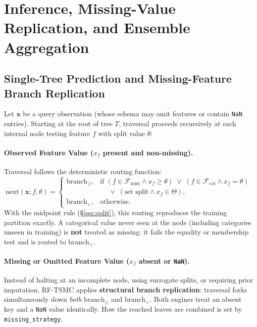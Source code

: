 \documentclass[11pt,a4paper]{article}
\newcommand{\code}[1]{\texttt{#1}}
\begin{document}
\section{Inference, Missing-Value Replication, and Ensemble Aggregation}

\subsection{Single-Tree Prediction and Missing-Feature Branch Replication}
\label{sec:single_tree_pred}

Let $\mathbf{x}$ be a query observation (whose schema may omit features or contain \code{NaN} entries). Starting at the root of tree $T$, traversal proceeds recursively at each internal node testing feature $f$ with split value $\theta$:

\paragraph{Observed Feature Value ($x_f$ present and non-missing).}
Traversal follows the deterministic routing function:
\begin{equation}
  \text{next}(\mathbf{x}; f, \theta) =
  \begin{cases}
    \text{branch}_{\ge}, & \text{if } (f \in \mathcal{F}_{\text{num}} \land x_f \ge \theta) \;\lor\; (f \in \mathcal{F}_{\text{cat}} \land x_f = \theta) \\
    & \quad \;\lor\; (\text{set split} \land x_f \in \Theta), \\
    \text{branch}_{<}, & \text{otherwise.}
  \end{cases}
\end{equation}
With the midpoint rule (\S\ref{sec:split}), this routing reproduces the training partition exactly. A categorical value never seen at the node (including categories unseen in training) is \textbf{not} treated as missing: it fails the equality or membership test and is routed to $\text{branch}_{<}$.

\paragraph{Missing or Omitted Feature Value ($x_f$ absent or \code{NaN}).}
Instead of halting at an incomplete node, using surrogate splits, or requiring prior imputation, RF-TSMC applies \textbf{structural branch replication}: traversal forks simultaneously down \emph{both} $\text{branch}_{\ge}$ and $\text{branch}_{<}$. Both engines treat an absent key and a \code{NaN} value identically. How the reached leaves are combined is set by \code{missing\_strategy}.
\end{document}
